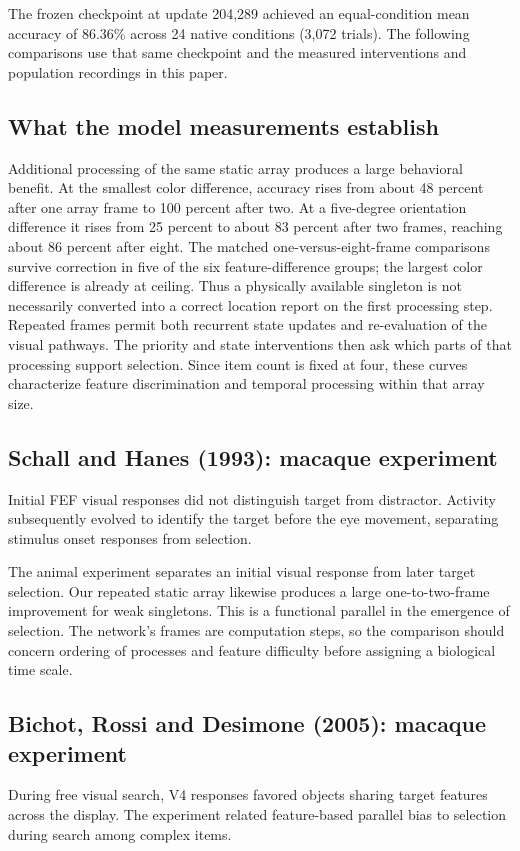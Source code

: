 \documentclass[11pt]{article}
\begin{document}
The frozen checkpoint at update 204,289 achieved an equal-condition mean accuracy of 86.36\% across 24 native conditions (3,072 trials). The following comparisons use that same checkpoint and the measured interventions and population recordings in this paper.

\subsection{What the model measurements establish}
Additional processing of the same static array produces a large behavioral benefit. At the smallest color difference, accuracy rises from about 48 percent after one array frame to 100 percent after two. At a five-degree orientation difference it rises from 25 percent to about 83 percent after two frames, reaching about 86 percent after eight. The matched one-versus-eight-frame comparisons survive correction in five of the six feature-difference groups; the largest color difference is already at ceiling. Thus a physically available singleton is not necessarily converted into a correct location report on the first processing step. Repeated frames permit both recurrent state updates and re-evaluation of the visual pathways. The priority and state interventions then ask which parts of that processing support selection. Since item count is fixed at four, these curves characterize feature discrimination and temporal processing within that array size.

\subsection{Schall and Hanes (1993): macaque experiment}
Initial FEF visual responses did not distinguish target from distractor. Activity subsequently evolved to identify the target before the eye movement, separating stimulus onset responses from selection. \cite{bio_schall}

The animal experiment separates an initial visual response from later target selection. Our repeated static array likewise produces a large one-to-two-frame improvement for weak singletons. This is a functional parallel in the emergence of selection. The network’s frames are computation steps, so the comparison should concern ordering of processes and feature difficulty before assigning a biological time scale.

\subsection{Bichot, Rossi and Desimone (2005): macaque experiment}
During free visual search, V4 responses favored objects sharing target features across the display. The experiment related feature-based parallel bias to selection during search among complex items. \cite{bio_bichot}
\end{document}
